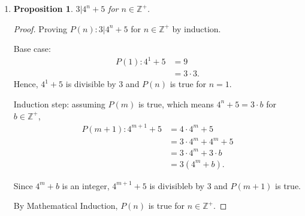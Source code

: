 \documentclass{article}
\newtheorem{prop}[thm]{Proposition}
\begin{document}
\begin{enumerate}[label={(\arabic*)}]
\begin{proof}
    Induction step: assuming $P(m)$ is true,
    \begin{align}
        P(m+1): \sum_{k=1}^{2^{m+1}}\frac{1}{k} & = \sum_{k=1}^{2^m}\frac{1}{k} + \sum_{k=2^m + 1}^{2^{m+1}}\frac{1}{k} \\
        & \ge 1 + \frac{m}{2} + (2^{m+1} - (2^m + 1) + 1)\frac{1}{2^{m+1}} \\ 
        & \ge 1 + \frac{m}{2} + (2^{m+1} - \frac{2^{m+1}}{2})\frac{1}{2^{m+1}} \\ 
        & \ge 1 + \frac{m}{2} + (\frac{1}{2} \cdot 2^{m+1})\frac{1}{2^{m+1}} \\ 
        & \ge 1 + \frac{m}{2} + \frac{1}{2} \\ 
        & \ge 1 + \frac{m+1}{2}.
    \end{align}

    Therefore, $P(m+1)$ is true.

    By Mathematical Induction, $P(n)$ is true for $n \in \mathbb{N}$.
\end{proof}

\item 
\begin{prop}
    $3 | 4^n + 5$ for $n \in \mathbb{Z}^+$.
\end{prop}
\begin{proof}
    Proving $P(n): 3|4^n + 5$ for $n \in \mathbb{Z}^+$ by induction.

    Base case: 
    \begin{align}
        P(1): 4^1 + 5 & = 9 \\
        & = 3 \cdot 3.
    \end{align}
    Hence, $4^1 + 5$ is divisible by 3 and $P(n)$ is true for $n = 1$.

    Induction step: assuming $P(m)$ is true, which means $4^n + 5 = 3 \cdot b$ for $b \in \mathbb{Z}^+$,
    \begin{align}
        P(m+1): 4^{m+1} + 5 & = 4 \cdot 4^m + 5 \\
        & = 3 \cdot 4^m + 4^m + 5 \\
        & = 3 \cdot 4^m + 3 \cdot b \\
        & = 3(4^m + b).
    \end{align}

    Since $4^m + b$ is an integer, $4^{m+1} + 5$ is divisibleb by 3 and $P(m+1)$ is true.

    By Mathematical Induction, $P(n)$ is true for $n \in \mathbb{Z}^+$.
\end{proof}


\end{enumerate}
\end{document}
